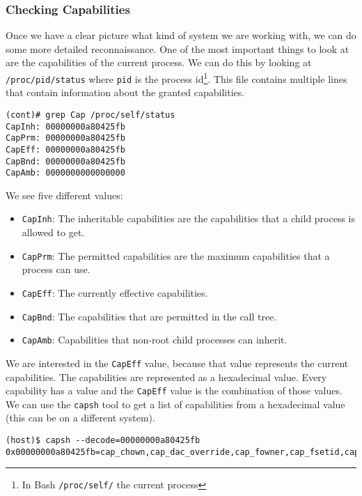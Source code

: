 \subsubsection{Checking Capabilities}
Once we have a clear picture what kind of system we are working with, we can do some more detailed reconnaissance. One of the most important things to look at are the capabilities of the current process. We can do this by looking at \lstinline{/proc/pid/status} where \lstinline{pid} is the process id\footnote{In Bash \lstinline{/proc/self/} the current process}. This file contains multiple lines that contain information about the granted capabilities.

\begin{lstlisting}
(cont)# grep Cap /proc/self/status
CapInh:	00000000a80425fb
CapPrm:	00000000a80425fb
CapEff:	00000000a80425fb
CapBnd:	00000000a80425fb
CapAmb:	0000000000000000
\end{lstlisting}

We see five different values:
\begin{itemize}
    \item \lstinline{CapInh}: The inheritable capabilities are the capabilities that a child process is allowed to get.
    \item \lstinline{CapPrm}: The permitted capabilities are the maximum capabilities that a process can use.
    \item \lstinline{CapEff}: The currently effective capabilities.
    \item \lstinline{CapBnd}: The capabilities that are permitted in the call tree.
    \item \lstinline{CapAmb}: Capabilities that non-root child processes can inherit.
\end{itemize}

We are interested in the \lstinline{CapEff} value, because that value represents the current capabilities. The capabilities are represented as a hexadecimal value. Every capability has a value and the \lstinline{CapEff} value is the combination of those values. We can use the \lstinline{capsh} tool to get a list of capabilities from a hexadecimal value (this can be on a different system).

\begin{lstlisting}
(host)$ capsh --decode=00000000a80425fb
0x00000000a80425fb=cap_chown,cap_dac_override,cap_fowner,cap_fsetid,cap_kill,cap_setgid,cap_setuid,cap_setpcap,cap_net_bind_service,cap_net_raw,cap_sys_chroot,cap_mknod,cap_audit_write,cap_setfcap
\end{lstlisting}

